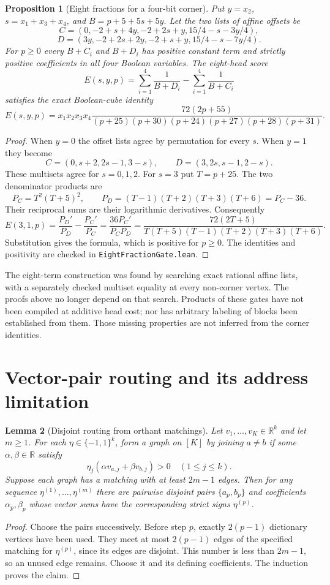 \documentclass[11pt]{article}
\newtheorem{proposition}{Proposition}
\newtheorem{lemma}[proposition]{Lemma}
\begin{document}
\begin{proposition}[Eight fractions for a four-bit corner]
Put $y=x_2$, $s=x_1+x_3+x_4$, and $B=p+5+5s+5y$. Let the two lists
of affine offsets be
\[
 C=(0,-2+s+4y,-2+2s+y,15/4-s-3y/4),
\]
\[
 D=(3y,-2+2s+2y,-2+s+y,15/4-s-7y/4).
\]
For $p\geq0$ every $B+C_i$ and $B+D_i$ has positive constant term
and strictly positive coefficients in all four Boolean variables.
The eight-head score
\[
 E(s,y,p)=\sum_{i=1}^4\frac1{B+D_i}
         -\sum_{i=1}^4\frac1{B+C_i}
\]
satisfies the exact Boolean-cube identity
\[
 E(s,y,p)=x_1x_2x_3x_4
 \frac{72(2p+55)}
 {(p+25)(p+30)(p+24)(p+27)(p+28)(p+31)}.
\]
\end{proposition}
\begin{proof}
When $y=0$ the offset lists agree by permutation for every $s$.
When $y=1$ they become
\[
 C=(0,s+2,2s-1,3-s),\qquad
 D=(3,2s,s-1,2-s).
\]
These multisets agree for $s=0,1,2$. For $s=3$ put $T=p+25$.
The two denominator products are
\[
 P_C=T^2(T+5)^2,\qquad
 P_D=(T-1)(T+2)(T+3)(T+6)=P_C-36.
\]
Their reciprocal sums are their logarithmic derivatives. Consequently
\[
 E(3,1,p)=\frac{P_D'}{P_D}-\frac{P_C'}{P_C}
 =\frac{36P_C'}{P_CP_D}
 =\frac{72(2T+5)}{T(T+5)(T-1)(T+2)(T+3)(T+6)}.
\]
Substitution gives the formula, which is positive for $p\geq0$.
The identities and positivity are checked in
\texttt{EightFractionGate.lean}.
\end{proof}

The eight-term construction was found by searching exact rational
affine lists, with a separately checked multiset equality at every
non-corner vertex. The proofs above no longer depend on that search.
Products of these gates have not been compiled at additive head cost;
nor has arbitrary labeling of blocks been established from them.
Those missing properties are not inferred from the corner identities.

\section{Vector-pair routing and its address limitation}

\begin{lemma}[Disjoint routing from orthant matchings]
Let $v_1,\ldots,v_K\in\mathbb R^k$ and let $m\geq1$.
For each $\eta\in\{-1,1\}^k$, form a graph on $[K]$ by joining
$a\neq b$ if some $\alpha,\beta\in\mathbb R$ satisfy
\[
 \eta_j(\alpha v_{a,j}+\beta v_{b,j})>0\quad(1\leq j\leq k).
\]
Suppose each graph has a matching with at least $2m-1$ edges.
Then for any sequence $\eta^{(1)},\ldots,\eta^{(m)}$ there are
pairwise disjoint pairs $\{a_p,b_p\}$ and coefficients
$\alpha_p,\beta_p$ whose vector sums have the corresponding strict
signs $\eta^{(p)}$.
\end{lemma}
\begin{proof}
Choose the pairs successively. Before step $p$, exactly $2(p-1)$
dictionary vertices have been used. They meet at most $2(p-1)$ edges
of the specified matching for $\eta^{(p)}$, since its edges are
disjoint. This number is less than $2m-1$, so an unused edge remains.
Choose it and its defining coefficients. The induction proves the claim.
\end{proof}
\end{document}

